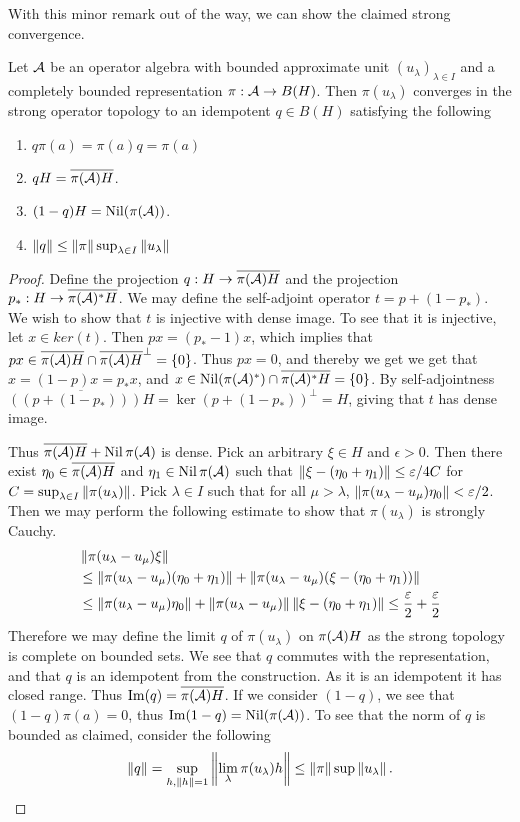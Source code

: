 With this minor remark out of the way, we can show the claimed strong convergence. 
\begin{proposition}\label{mesrennie17}
	Let $\mathcal{A}$ be an operator algebra with bounded approximate unit $(u_{\lambda})_{\lambda \in I}$ and a completely bounded representation $\pi:\mathcal{A} \to B(H)$. Then $\pi(u_\lambda)$ converges in the strong operator topology to an idempotent $q\in B(H)$ satisfying the following 
	\begin{enumerate}
		\item
			$q\pi(a)=\pi(a)q=\pi(a)$
		\item
			$qH=\overline{\pi(\mathcal{A})H}$. 
		\item
			$(1-q)H=\operatorname{Nil}(\pi(\mathcal{A}))$. 
		\item
			$\left \Vert q \right \Vert\leq \left \Vert \pi \right \Vert\sup_{\lambda \in I}\left \Vert u_\lambda \right \Vert$
	\end{enumerate}
\end{proposition}
\begin{proof}
	Define the projection $q:H\to \overline{\pi(\mathcal{A})H}$ and the projection $p_*:H\to \overline{\pi(\mathcal{A})^*H}$. We may define the self-adjoint operator $t=p+(1-p_*)$. We wish to show that $t$ is injective with dense image. To see that it is injective, let $x\in ker(t)$. Then $px=(p_*-1)x$, which implies that $px\in \overline{\pi(\mathcal{A})H}\cap \overline{\pi(\mathcal{A})H}^\perp=\{0\}$. Thus $px=0$, and thereby we get we get that $x=(1-p)x=p_*x$, and $x\in \operatorname{Nil}(\pi(\mathcal{A})^*)\cap \overline{\pi(\mathcal{A})^*H}=\{0\}$. By self-adjointness $\overline{((p+(1-p_*)))H}=\ker(p+(1-p_*))^\perp=H$, giving that $t$ has dense image. 
	
	Thus $\overline{\pi(\mathcal{A})H}+\operatorname{Nil}\pi(\mathcal{A})$ is dense. Pick an arbitrary $\xi\in H$ and $\epsilon>0$. Then there exist $\eta_0\in \overline{\pi(\mathcal{A})H}$ and $\eta_1\in \operatorname{Nil}\pi(\mathcal{A})$ such that $\left \Vert \xi-(\eta_0+\eta_1) \right \Vert\leq \varepsilon/4C$ for $C=\sup_{\lambda \in I}\left \Vert \pi(u_{\lambda}) \right \Vert$. Pick $\lambda\in I$ such that for all $\mu>\lambda$, $\left \Vert \pi(u_\lambda-u_\mu)\eta_0 \right \Vert<\varepsilon/2$. Then we may perform the following estimate to show that $\pi(u_\lambda)$ is strongly Cauchy. 
	\begin{align*}
		&\left \Vert \pi(u_{\lambda}-u_\mu)\xi \right \Vert \\
		&\leq \left \Vert \pi(u_\lambda-u_\mu)(\eta_0+\eta_1) \right \Vert+\left \Vert \pi(u_\lambda-u_\mu)(\xi-(\eta_0+\eta_1)) \right \Vert \\
		&\leq \left \Vert \pi(u_\lambda-u_\mu)\eta_0 \right \Vert+\left \Vert \pi(u_\lambda-u_\mu) \right \Vert\left \Vert \xi-(\eta_0+\eta_1) \right \Vert\leq \frac{\varepsilon}{2}+\frac{\varepsilon}{2}
	\end{align*}
	Therefore we may define the limit $q$ of $\pi(u_\lambda)$ on $\pi(\mathcal{A})H$ as the strong topology is complete on bounded sets. We see that $q$ commutes with the representation, and that $q$ is an idempotent from the construction. As it is an idempotent it has closed range. Thus $\operatorname{Im}(q)=\overline{\pi(\mathcal{A})H}$. If we consider $(1-q)$, we see that $(1-q)\pi(a)=0$, thus $\operatorname{Im}(1-q)=\operatorname{Nil}(\pi(\mathcal{A}))$.
	To see that the norm of $q$ is bounded as claimed, consider the following 
	\begin{align*}
		\left \Vert q \right \Vert=\sup_{h,\left \Vert h \right \Vert=1}\left \Vert \lim_{\lambda}\pi(u_\lambda)h \right \Vert\leq \left \Vert \pi \right \Vert\sup\left \Vert u_\lambda \right \Vert. 
	\end{align*}
\end{proof}
